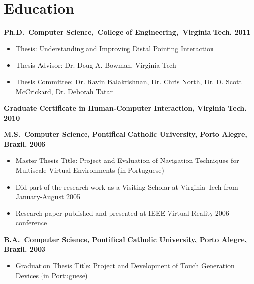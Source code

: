 \documentclass[wideaddress]{vitae}
\let\olditem\item
\def\item{\nopagebreak[4]\olditem}%
\newcommand{\VT}{Virginia Tech}
\begin{document}
\section{Education}
\begin{description}
	\item{\textbf{Ph.D.~Computer Science,~College of Engineering,~\VT. 2011}}
		\begin{itemize}
			\item{Thesis: Understanding and Improving Distal Pointing Interaction}
 			\item{Thesis Advisor: Dr. Doug A. Bowman, \VT}
	 		\item{Thesis Committee: Dr. Ravin Balakrishnan, Dr. Chris North, Dr. D. Scott McCrickard, Dr. Deborah Tatar}
		\end{itemize}
	\item{\textbf{Graduate Certificate in Human-Computer Interaction, \VT. 2010}}
 	\item{\textbf{M.S.~Computer Science, Pontifical Catholic University, Porto Alegre, Brazil. 2006}}
		 \begin{itemize}
			 \item{Master Thesis Title: Project and Evaluation of Navigation Techniques for Multiscale Virtual Environments (in Portuguese)}
			 \item{Did part of the research work as a Visiting Scholar at Virginia Tech from January-August 2005}
			 \item{Research paper published and presented at IEEE Virtual Reality 2006 conference}
		 \end{itemize}
	 \item{\textbf{B.A.~Computer Science, Pontifical Catholic University, Porto Alegre, Brazil. 2003}}
		 \begin{itemize}
			 \item{Graduation Thesis Title: Project and Development of Touch Generation Devices (in Portuguese)}
		 \end{itemize}
 \end{description}
\end{document}
